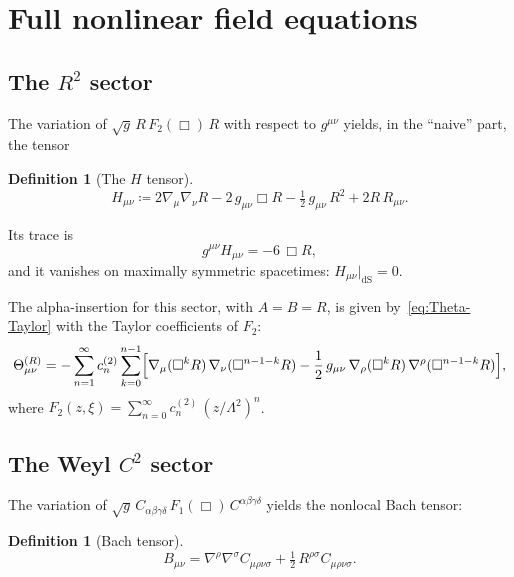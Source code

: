 \documentclass[12pt,a4paper]{article}
\newcommand{\Lam}{\Lambda}
\theoremstyle{plain}
\theoremstyle{definition}
\newtheorem{definition}[theorem]{Definition}
\begin{document}
\section{Full nonlinear field equations}
\label{sec:field-equations}

\subsection{The \texorpdfstring{$R^2$}{R2} sector}

The variation of $\sqrt{g}\,R\,F_2(\Box)\,R$ with respect to $g^{\mu\nu}$
yields, in the ``naive'' part, the tensor

\begin{definition}[The $H$ tensor]
\label{def:H-tensor}
\begin{equation}\label{eq:H-def}
  H_{\mu\nu} \coloneqq 2\nabla_\mu\nabla_\nu R
  - 2\,g_{\mu\nu}\Box R
  - \tfrac{1}{2}\,g_{\mu\nu}\,R^2
  + 2R\,R_{\mu\nu}.
\end{equation}
\end{definition}

\noindent
Its trace is
\begin{equation}\label{eq:H-trace}
  g^{\mu\nu}H_{\mu\nu} = -6\,\Box R,
\end{equation}
and it vanishes on maximally symmetric spacetimes:
$H_{\mu\nu}|_{\mathrm{dS}} = 0$.

The alpha-insertion for this sector, with $A = B = R$, is given
by~\eqref{eq:Theta-Taylor} with the Taylor coefficients of $F_2$:
\begin{equation}\label{eq:Theta-R}
  \Theta^{(R)}_{\mu\nu} = -\sum_{n=1}^{\infty} c_n^{(2)}
  \sum_{k=0}^{n-1}
  \Bigl[\nabla_\mu(\Box^k R)\,\nabla_\nu(\Box^{n-1-k} R)
  - \frac{1}{2}\,g_{\mu\nu}\,\nabla_\rho(\Box^k R)\,
  \nabla^\rho(\Box^{n-1-k} R)\Bigr],
\end{equation}
where $F_2(z,\xi) = \sum_{n=0}^{\infty} c_n^{(2)}\,(z/\Lam^2)^n$.

\subsection{The Weyl \texorpdfstring{$C^2$}{C2} sector}

The variation of $\sqrt{g}\,C_{\alpha\beta\gamma\delta}\,
F_1(\Box)\,C^{\alpha\beta\gamma\delta}$ yields the nonlocal Bach tensor:

\begin{definition}[Bach tensor]
\label{def:bach}
\begin{equation}\label{eq:bach}
  B_{\mu\nu} = \nabla^\rho\nabla^\sigma C_{\mu\rho\nu\sigma}
  + \tfrac{1}{2}\,R^{\rho\sigma}C_{\mu\rho\nu\sigma}.
\end{equation}
\end{definition}
\end{document}
